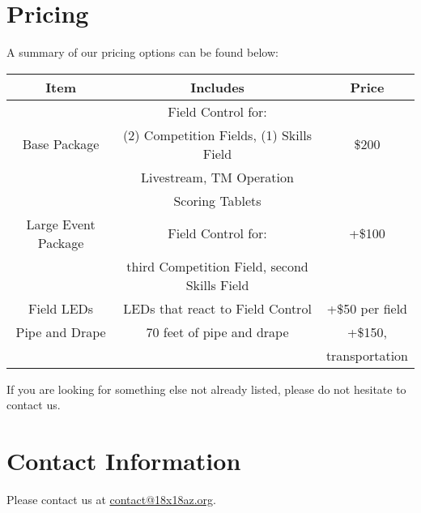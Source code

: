 \documentclass[12pt]{article}
\begin{document}
\section{Pricing}
A summary of our pricing options can be found below:
\begin{center}
    \begin{tabular}{|c|c|c|}
        \hline
        \textbf{Item} & \textbf{Includes} & \textbf{Price} \\
        \hline
                 & Field Control for:    &  \\
        Base Package & (2) Competition Fields, (1) Skills Field         & \$200 \\
                 & Livestream, TM Operation & \\
                 & Scoring Tablets          & \\
        \hline
        Large Event Package & Field Control for: & +\$100 \\
        & third Competition Field, second Skills Field & \\
        \hline
        Field LEDs & LEDs that react to Field Control & +\$50 per field \\
        \hline
        Pipe and Drape & 70 feet of pipe and drape & +\$150, \\
                       & & transportation \\
        \hline
    \end{tabular}
\end{center}
If you are looking for something else not already listed, please do not hesitate to contact us.

\section{Contact Information}
Please contact us at \href{mailto:contact@18x18az.org}{contact@18x18az.org}.
\end{document}
